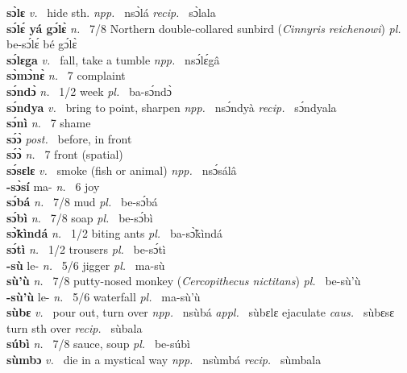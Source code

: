 {\bfseries sɔ̀lɛ}  {\itshape v.~} hide sth.   {\itshape npp.~} nsɔ̀lá {\itshape recip.~} sɔ̀lala  \\ 
{\bfseries sɔ́lɛ́ yá gɔ́lɛ̀}  {\itshape n.~} 7/8 Northern double-collared sunbird ({\itshape Cinnyris reichenowi}) {\itshape pl.~} be-sɔ́lɛ́ bé gɔ́lɛ̀    \\ 
{\bfseries sɔ́lɛga}  {\itshape v.~} fall, take a tumble   {\itshape npp.~} nsɔ́lɛ́gâ  \\ 
{\bfseries sɔ̀mɔ̀nɛ̀}  {\itshape n.~} 7 complaint    \\ 
{\bfseries sɔ́ndɔ̀}  {\itshape n.~} 1/2 week {\itshape pl.~} ba-sɔ́ndɔ̀    \\ 
{\bfseries sɔ́ndya}  {\itshape v.~} bring to point, sharpen   {\itshape npp.~} nsɔ́ndyà {\itshape recip.~} sɔ́ndyala  \\ 
{\bfseries sɔ́nì}  {\itshape n.~} 7 shame    \\ 
{\bfseries sɔ́ɔ̀}  {\itshape post.~} before, in front    \\ 
{\bfseries sɔ́ɔ̀}  {\itshape n.~} 7 front (spatial)    \\ 
{\bfseries sɔ́sɛlɛ}  {\itshape v.~} smoke (fish or animal)   {\itshape npp.~} nsɔ́sálâ  \\ 
{\bfseries -sɔ̀sí} ma- {\itshape n.~} 6 joy    \\ 
{\bfseries sɔ́bá}  {\itshape n.~} 7/8 mud {\itshape pl.~} be-sɔ́bá    \\ 
{\bfseries sɔ́bì}  {\itshape n.~} 7/8 soap {\itshape pl.~} be-sɔ́bì    \\ 
{\bfseries sɔ̃̀kìndá}  {\itshape n.~} 1/2 biting ants {\itshape pl.~} ba-sɔ̃̀kìndá    \\ 
{\bfseries sɔ́tì}  {\itshape n.~} 1/2 trousers {\itshape pl.~} be-sɔ́tì    \\ 
{\bfseries -sù} le- {\itshape n.~} 5/6 jigger {\itshape pl.~} ma-sù    \\ 
{\bfseries sù'ù}  {\itshape n.~} 7/8 putty-nosed monkey ({\itshape Cercopithecus nictitans}) {\itshape pl.~} be-sù'ù    \\ 
{\bfseries -sù'ù} le- {\itshape n.~} 5/6 waterfall {\itshape pl.~} ma-sù'ù    \\ 
{\bfseries sùbɛ}  {\itshape v.~} pour out, turn over   {\itshape npp.~} nsùbá {\itshape appl.~} sùbɛlɛ ejaculate {\itshape caus.~} sùbɛsɛ turn sth over {\itshape recip.~} sùbala  \\ 
{\bfseries súbì}  {\itshape n.~} 7/8 sauce, soup {\itshape pl.~} be-súbì    \\ 
{\bfseries sùmbɔ}  {\itshape v.~} die in a mystical way   {\itshape npp.~} nsùmbá {\itshape recip.~} sùmbala  \\ 
